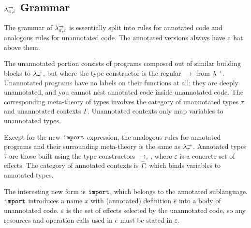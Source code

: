 \subsection{$\lambda^{\rightarrow}_{\pi, \varepsilon}$ Grammar}

The grammar of $\lambda^{\rightarrow}_{\pi, \varepsilon}$ is essentially split into rules for annotated code and analogous rules for unannotated code. The annotated versions always have a hat above them.

The unannotated portion consists of programs composed out of similar building blocks to $\lambda^{\rightarrow}_{\pi}$, but where the type-constructor is the regular $\rightarrow$ from $\lambda^{\rightarrow}$. Unannotated programs have no labels on their functions at all; they are deeply unannotated, and you cannot nest annotated code inside unannotated code. The corresponding meta-theory of types involves the category of unannotated types $\tau$ and unannotated contexts $\Gamma$. Unannotated contexts only map variables to unannotated types.

Except for the new $\mathtt{import}$ expression, the analogous rules for annotated programs and their surrounding meta-theory is the same as $\lambda^{\rightarrow}_{\pi}$. Annotated types $\hat \tau$ are those built using the type constructors $\rightarrow_{\varepsilon}$, where $\varepsilon$ is a concrete set of effects. The category of annotated contexts is $\hat \Gamma$, which binds variables to annotated types.

The interesting new form is $\mathtt{import}$, which belongs to the annotated sublanguage. $\mathtt{import}$ introduces a name $x$ with (annotated) definition $\hat e$ into a body of unannotated code. $\varepsilon$ is the set of effects selected by the unannotated code, so any resources and operation calls used in $e$ must be stated in $\varepsilon$.


